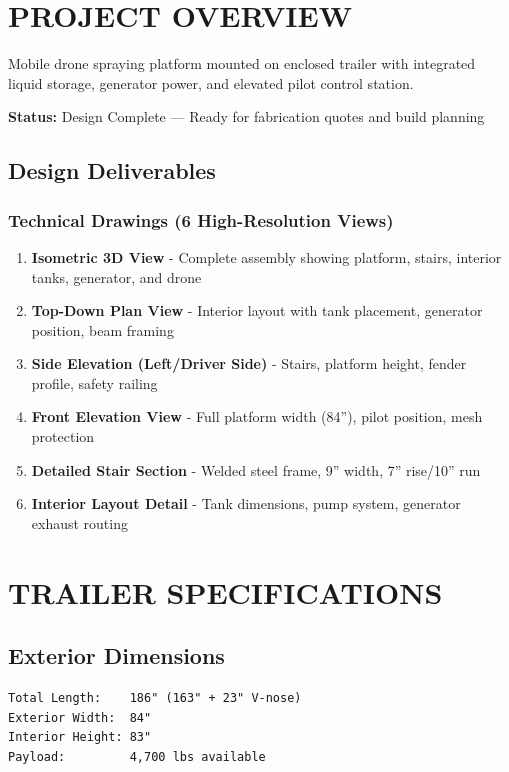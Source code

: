 \documentclass[11pt,letter]{article}
\begin{document}
\newpage

\tableofcontents

\newpage

\section{PROJECT OVERVIEW}

Mobile drone spraying platform mounted on enclosed trailer with integrated liquid storage, generator power, and elevated pilot control station.

\textbf{Status:} Design Complete --- Ready for fabrication quotes and build planning

\subsection{Design Deliverables}

\subsubsection{Technical Drawings (6 High-Resolution Views)}
\begin{enumerate}
  \item \textbf{Isometric 3D View} - Complete assembly showing platform, stairs, interior tanks, generator, and drone
  \item \textbf{Top-Down Plan View} - Interior layout with tank placement, generator position, beam framing
  \item \textbf{Side Elevation (Left/Driver Side)} - Stairs, platform height, fender profile, safety railing
  \item \textbf{Front Elevation View} - Full platform width (84''), pilot position, mesh protection
  \item \textbf{Detailed Stair Section} - Welded steel frame, 9'' width, 7'' rise/10'' run
  \item \textbf{Interior Layout Detail} - Tank dimensions, pump system, generator exhaust routing
\end{enumerate}

\section{TRAILER SPECIFICATIONS}

\subsection{Exterior Dimensions}
\begin{verbatim}
Total Length:    186" (163" + 23" V-nose)
Exterior Width:  84"
Interior Height: 83"
Payload:         4,700 lbs available
\end{verbatim}
\end{document}
